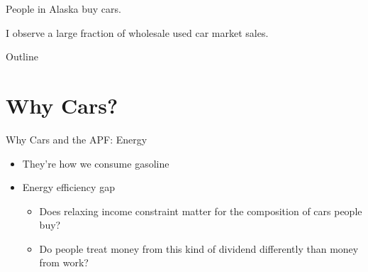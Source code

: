 \documentclass[aspectratio=169]{beamer}
\begin{document}
\begin{frame}
	\large People in Alaska buy cars.
\end{frame}


{  %
\begin{frame}[plain]
\end{frame}
}

\begin{frame}
	\large I observe a large fraction of wholesale used car market sales.
\end{frame}

{  %

\begin{frame}[plain]
\end{frame}
}

\begin{frame}{Outline}
	\tableofcontents
\end{frame}

\section[Cars]{Why Cars?}

\begin{frame}{Why Cars and the APF: Energy}
	\begin{itemize}
		\item They're how we consume gasoline
		\item Energy efficiency gap
		\begin{itemize}
			\item Does relaxing income constraint matter for the composition of cars people buy?
			\item Do people treat money from this kind of dividend differently than money from work?
		\end{itemize}
	\end{itemize}
\end{frame}
\end{document}
